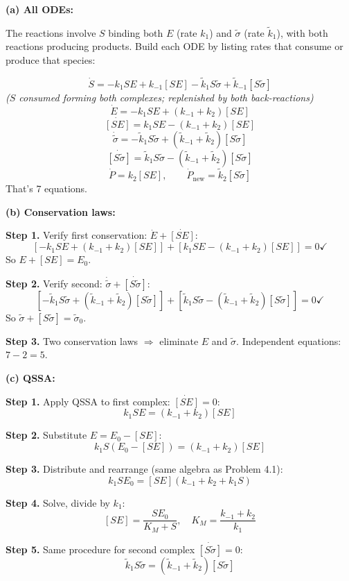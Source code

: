 \documentclass[10pt]{article}
\newcommand{\stepwhy}[1]{\textcolor{blue!60!black}{\small\textit{(#1)}}}
\begin{document}
\begin{solution}
\textbf{(a) All ODEs:}

The reactions involve $S$ binding both $E$ (rate $k_1$) and $\tilde\sigma$ (rate $\tilde k_1$), with both reactions producing products. Build each ODE by listing rates that consume or produce that species:

\[
\dot S = -k_1 SE + k_{-1}[SE] - \tilde k_1 S\tilde\sigma + \tilde k_{-1}[S\tilde\sigma]
\]
\stepwhy{$S$ consumed forming both complexes; replenished by both back-reactions}
\[
\dot E = -k_1 SE + (k_{-1}+k_2)[SE]
\]
\[
\dot{[SE]} = k_1 SE - (k_{-1}+k_2)[SE]
\]
\[
\dot{\tilde\sigma} = -\tilde k_1 S\tilde\sigma + (\tilde k_{-1}+\tilde k_2)[S\tilde\sigma]
\]
\[
\dot{[S\tilde\sigma]} = \tilde k_1 S\tilde\sigma - (\tilde k_{-1}+\tilde k_2)[S\tilde\sigma]
\]
\[
\dot P = k_2[SE], \qquad \dot P_{\text{new}} = \tilde k_2[S\tilde\sigma]
\]
That's 7 equations.

\medskip\textbf{(b) Conservation laws:}

\textbf{Step 1.} Verify first conservation: $\dot E + \dot{[SE]}$:
\[
[-k_1 SE + (k_{-1}+k_2)[SE]] + [k_1 SE - (k_{-1}+k_2)[SE]] = 0 \checkmark
\]
So $E + [SE] = E_0$.

\textbf{Step 2.} Verify second: $\dot{\tilde\sigma} + \dot{[S\tilde\sigma]}$:
\[
[-\tilde k_1 S\tilde\sigma + (\tilde k_{-1}+\tilde k_2)[S\tilde\sigma]] + [\tilde k_1 S\tilde\sigma - (\tilde k_{-1}+\tilde k_2)[S\tilde\sigma]] = 0 \checkmark
\]
So $\tilde\sigma + [S\tilde\sigma] = \tilde\sigma_0$.

\textbf{Step 3.} Two conservation laws $\Rightarrow$ eliminate $E$ and $\tilde\sigma$. Independent equations: $7 - 2 = 5$.

\medskip\textbf{(c) QSSA:}

\textbf{Step 1.} Apply QSSA to first complex: $\dot{[SE]} = 0$:
\[
k_1 SE = (k_{-1}+k_2)[SE]
\]

\textbf{Step 2.} Substitute $E = E_0 - [SE]$:
\[
k_1 S(E_0 - [SE]) = (k_{-1}+k_2)[SE]
\]

\textbf{Step 3.} Distribute and rearrange (same algebra as Problem 4.1):
\[
k_1 S E_0 = [SE](k_{-1} + k_2 + k_1 S)
\]

\textbf{Step 4.} Solve, divide by $k_1$:
\[
[SE] = \frac{S E_0}{K_M + S}, \quad K_M = \frac{k_{-1}+k_2}{k_1}
\]

\textbf{Step 5.} Same procedure for second complex $\dot{[S\tilde\sigma]} = 0$:
\[
\tilde k_1 S\tilde\sigma = (\tilde k_{-1}+\tilde k_2)[S\tilde\sigma]
\]


\end{solution}
\end{document}
